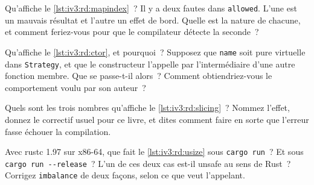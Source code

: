 \begin{question}\label{iq:iv3:reading-debugging-and-software-design:4}
Qu'affiche le \cref{lst:iv3:rd:mapindex}~? Il y a deux fautes dans \texttt{allowed}. L'une est un mauvais résultat et l'autre un effet de bord. Quelle est la nature de chacune, et comment feriez-vous pour que le compilateur détecte la seconde~?
\label{lst:iv3:rd:mapindex}
\end{question}

\begin{question}\label{iq:iv3:reading-debugging-and-software-design:5}
Qu'affiche le \cref{lst:iv3:rd:ctor}, et pourquoi~? Supposez que \texttt{name} soit pure virtuelle dans \texttt{Strategy}, et que le constructeur l'appelle par l'intermédiaire d'une autre fonction membre. Que se passe-t-il alors~? Comment obtiendriez-vous le comportement voulu par son auteur~?
\label{lst:iv3:rd:ctor}
\end{question}

\begin{question}\label{iq:iv3:reading-debugging-and-software-design:6}
Quels sont les trois nombres qu'affiche le \cref{lst:iv3:rd:slicing}~? Nommez l'effet, donnez le correctif usuel pour ce livre, et dites comment faire en sorte que l'erreur fasse échouer la compilation.
\label{lst:iv3:rd:slicing}
\end{question}

\begin{question}\label{iq:iv3:reading-debugging-and-software-design:7}
Avec rustc 1.97 sur x86-64, que fait le \cref{lst:iv3:rd:usize} sous \texttt{cargo run}~? Et sous \texttt{cargo run -{}-release}~? L'un de ces deux cas est-il unsafe au sens de Rust~? Corrigez \texttt{imbalance} de deux façons, selon ce que veut l'appelant.
\label{lst:iv3:rd:usize}
\end{question}

